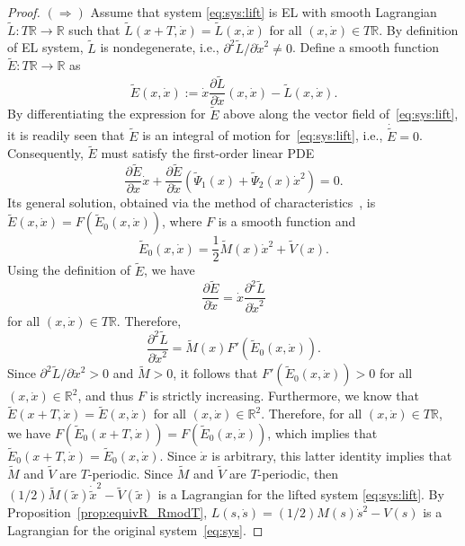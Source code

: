 \begin{proof}
	$(\Rightarrow)$ Assume that system \eqref{eq:sys:lift} is EL with
	smooth Lagrangian $\tilde L : T \mathbb{R} \to \mathbb{R}$ such that $\tilde
	L(x+T,\dot x) = \tilde L(x,\dot x)$ for all $(x,\dot x) \in T \mathbb{R}$.
	By definition of EL system, $\tilde L$ is nondegenerate, i.e.,
	$\partial^2 \tilde L / \partial \dot x^2 \neq 0$.  Define a smooth
	function $\tilde E : T \mathbb{R} \to \mathbb{R}$ as
				\[
	\tilde E(x,\dot x) := \dot x \frac{\partial \tilde L}{\partial \dot x}
	(x,\dot x)- \tilde L(x,\dot x).
	\]
				By differentiating the expression for $\tilde E$ above along the
	vector field of~\eqref{eq:sys:lift}, it is readily seen that $\tilde
	E$ is an integral of motion for~\eqref{eq:sys:lift}, i.e., $\dot
	{\tilde E}=0$. Consequently, $\tilde E$ must satisfy the first-order
	linear PDE 
				\begin{equation}\label{eq:PDE}
	\frac{\partial \tilde{E}}{\partial x}\dot{x}+\frac{\partial
		\tilde{E}}{\partial \dot{x}}\left(
	\tilde{\Psi}_1(x)+\tilde{\Psi}_2(x)\dot{x}^2 \right)=0.
	\end{equation}
				Its general solution, obtained via the method of
	characteristics~\cite{YehudaPDE}, is
	$\tilde{E}(x,\dot{x})=F(\tilde{E}_0(x,\dot{x}))$, where $F$ is a
	smooth function and
				\[
	\tilde{E}_0(x,\dot{x})=\frac{1}{2}\tilde{M}(x)\dot{x}^2+\tilde{V}(x).
	\]
				Using the definition of $\tilde{E}$, we have
				\[
	\frac{\partial \tilde{E}}{\partial
		\dot{x}}=\dot{x}\frac{\partial^2
		\tilde{{L}}}{\partial \dot{x}^2}
	\]
				for all $(x,\dot{x})\in T \mathbb{R}$. Therefore, 
				\[
	\frac{\partial^2 \tilde{L}}{\partial
		\dot{x}^2}=\tilde{M}(x)F'(\tilde{E}_0(x,\dot{x})).
	\]
				Since $\partial^2 \tilde L / \partial \dot x^2 > 0$ and $\tilde M>0$,
	it follows that $F'(\tilde{E}_0(x,\dot{x}))>0$ for all $(x,\dot{x})\in
	\mathbb{R}^2$, and thus $F$ is strictly increasing. Furthermore, we know that
	$\tilde{E}(x+T,\dot{x})=\tilde{E}(x,\dot{x})$ for all $(x,\dot{x})\in
	\mathbb{R}^2$. Therefore, for all $(x,\dot x)\in T\mathbb{R}$, we have $F(\tilde
	E_0(x+T,\dot x)) = F(\tilde E_0(x,\dot x))$, which implies that
	$\tilde{E}_0(x+T,\dot x) = \tilde{E}_0(x,\dot x)$. Since $\dot x$ is arbitrary, this
	latter identity implies that $\tilde M$ and $\tilde V$ are
	$T$-periodic. Since $\tilde M$ and $\tilde V$ are
	$T$-periodic, then $(1/2)\tilde{M}(\tilde{x})\dot{\tilde{x}}^2-\tilde{V}(\tilde{x})$ is a Lagrangian for the lifted system \eqref{eq:sys:lift}. By Proposition~\ref{prop:equivR_RmodT}, $L(s,\dot{s})=(1/2)M(s)\dot{s}^2-V(s)$ is a Lagrangian for the original system~\eqref{eq:sys}.  \qquad\end{proof}
